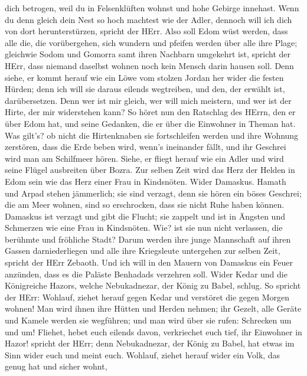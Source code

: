 dich betrogen, weil du in Felsenklüften wohnst und hohe Gebirge
innehast. Wenn du denn gleich dein Nest so hoch machtest wie der Adler,
dennoch will ich dich von dort herunterstürzen, spricht der HErr.
 Also soll Edom wüst werden, dass alle die, die
vorübergehen, sich wundern und pfeifen werden über alle ihre Plage;
 gleichwie Sodom und Gomorra samt ihren Nachbarn umgekehrt
ist, spricht der HErr, dass niemand daselbst wohnen noch kein Mensch
darin hausen soll.  Denn siehe, er kommt herauf wie ein
Löwe vom stolzen Jordan her wider die festen Hürden; denn ich will sie
daraus eilends wegtreiben, und den, der erwählt ist, darübersetzen. Denn
wer ist mir gleich, wer will mich meistern, und wer ist der Hirte, der
mir widerstehen kann?  So höret nun den Ratschlag des
HErrn, den er über Edom hat, und seine Gedanken, die er über die
Einwohner in Theman hat. Was gilt's? ob nicht die Hirtenknaben sie
fortschleifen werden und ihre Wohnung zerstören,  dass die
Erde beben wird, wenn's ineinander fällt, und ihr Geschrei wird man am
Schilfmeer hören.  Siehe, er fliegt herauf wie ein Adler
und wird seine Flügel ausbreiten über Bozra. Zur selben Zeit wird das
Herz der Helden in Edom sein wie das Herz einer Frau in Kindsnöten.
 Wider Damaskus. Hamath und Arpad stehen jämmerlich; sie
sind verzagt, denn sie hören ein böses Geschrei; die am Meer wohnen,
sind so erschrocken, dass sie nicht Ruhe haben können. 
Damaskus ist verzagt und gibt die Flucht; sie zappelt und ist in Ängsten
und Schmerzen wie eine Frau in Kindsnöten.  Wie? ist sie
nun nicht verlassen, die berühmte und fröhliche Stadt? 
Darum werden ihre junge Mannschaft auf ihren Gassen darniederliegen und
alle ihre Kriegsleute untergehen zur selben Zeit, spricht der HErr
Zebaoth.  Und ich will in den Mauern von Damaskus ein Feuer
anzünden, dass es die Paläste Benhadads verzehren soll. 
Wider Kedar und die Königreiche Hazors, welche Nebukadnezar, der König
zu Babel, schlug. So spricht der HErr: Wohlauf, ziehet herauf gegen
Kedar und verstöret die gegen Morgen wohnen!  Man wird
ihnen ihre Hütten und Herden nehmen; ihr Gezelt, alle Geräte und Kamele
werden sie wegführen; und man wird über sie rufen: Schrecken um und um!
 Fliehet, hebet euch eilends davon, verkriechet euch tief,
ihr Einwohner in Hazor! spricht der HErr; denn Nebukadnezar, der König
zu Babel, hat etwas im Sinn wider euch und meint euch. 
Wohlauf, ziehet herauf wider ein Volk, das genug hat und sicher wohnt,
